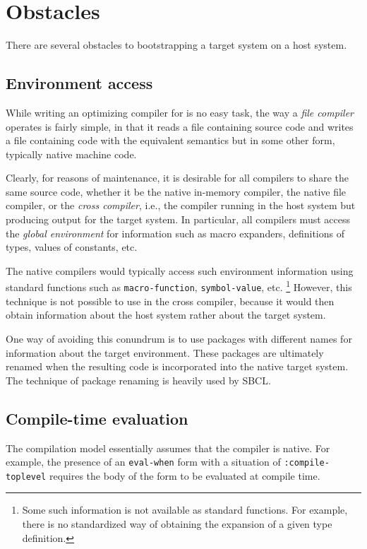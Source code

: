 \section{Obstacles}

There are several obstacles to bootstrapping a target \commonlisp{}
system on a host \commonlisp{} system.

\subsection{Environment access}

While writing an optimizing compiler for \commonlisp{} is no easy
task, the way a \emph{file compiler} operates is fairly simple, in
that it reads a file containing source code and writes a file
containing code with the equivalent semantics but in some other form,
typically native machine code.

Clearly, for reasons of maintenance, it is desirable for all compilers
to share the same source code, whether it be the native in-memory
compiler, the native file compiler, or the \emph{cross compiler},
i.e., the compiler running in the host \commonlisp{} system but
producing output for the target system.  In particular, all compilers
must access the \emph{global environment} for information such as
macro expanders, definitions of types, values of constants, etc.

The native compilers would typically access such environment
information using standard functions such as \texttt{macro-function},
\texttt{symbol-value}, etc.%
\footnote{Some such information is not available as standard
  functions.  For example, there is no standardized way of obtaining
  the expansion of a given type definition.}
However, this technique is not possible to use in the cross compiler,
because it would then obtain information about the host \commonlisp{}
system rather about the target \commonlisp{} system.

One way of avoiding this conundrum is to use packages with different
names for information about the target environment.  These packages
are ultimately renamed when the resulting code is incorporated into
the native target system.  The technique of package renaming is
heavily used by SBCL.

\subsection{Compile-time evaluation}

The \commonlisp{} compilation model essentially assumes that
the compiler is native.  For example, the presence of an
\texttt{eval-when} form with a situation of \texttt{:compile-toplevel}
requires the body of the form to be evaluated at compile time.

